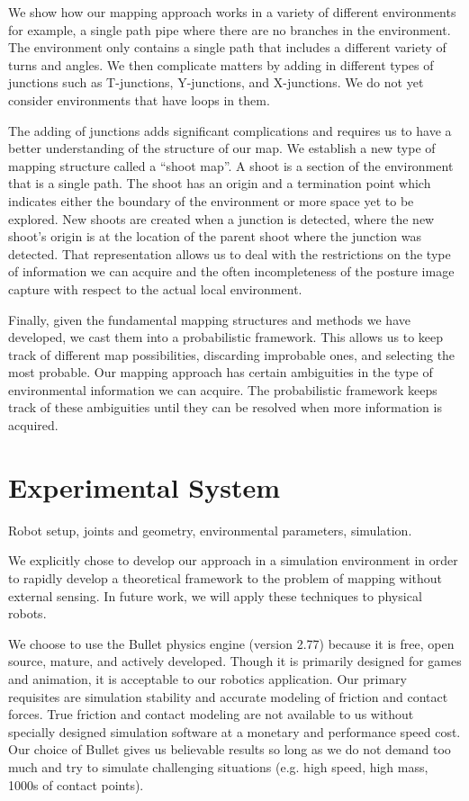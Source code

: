 We show how our mapping approach works in a variety of different environments for example, a single path pipe where there are no branches in the environment. The environment only contains a single path that includes a different variety of turns and angles. We then complicate matters by adding in different types of junctions such as T-junctions, Y-junctions, and X-junctions. We do not yet consider environments that have loops in them.

The adding of junctions adds significant complications and requires us to have a better understanding of the structure of our map. We establish a new type of mapping structure called a “shoot map”. A shoot is a section of the environment that is a single path. The shoot has an origin and a termination point which indicates either the boundary of the environment or more space yet to be explored. New shoots are created when a junction is detected, where the new shoot's origin is at the location of the parent shoot where the junction was detected. That representation allows us to deal with the restrictions on the type of information we can acquire and the often incompleteness of the posture image capture with respect to the actual local environment.

Finally, given the fundamental mapping structures and methods we have developed, we cast them into a probabilistic framework. This allows us to keep track of different map possibilities, discarding improbable ones, and selecting the most probable. Our mapping approach has certain ambiguities in the type of environmental information we can acquire. The probabilistic framework keeps track of these ambiguities until they can be resolved when more information is acquired.

\section{Experimental System}
\label{experimentalsystem}

Robot setup, joints and geometry, environmental parameters, simulation.

We explicitly chose to develop our approach in a simulation environment in order to rapidly develop a theoretical framework to the problem of mapping without external sensing. In future work, we will apply these techniques to physical robots.

We choose to use the Bullet physics engine (version 2.77) because it is free, open source, mature, and actively developed. Though it is primarily designed for games and animation, it is acceptable to our robotics application. Our primary requisites are simulation stability and accurate modeling of friction and contact forces. True friction and contact modeling are not available to us without specially designed simulation software at a monetary and performance speed cost. Our choice of Bullet gives us believable results so long as we do not demand too much and try to simulate challenging situations (e.g. high speed, high mass, 1000s of contact points).

